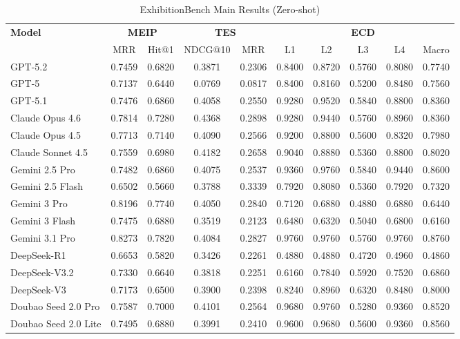\begin{table}[ht]
\centering
\caption{ExhibitionBench Main Results (Zero-shot)}
\label{tab:main-results}
\begin{tabular}{l|cc|cc|ccccc}
\toprule
\textbf{Model} & \multicolumn{2}{c|}{\textbf{MEIP}} & \multicolumn{2}{c|}{\textbf{TES}} & \multicolumn{5}{c}{\textbf{ECD}} \\
 & MRR & Hit@1 & NDCG@10 & MRR & L1 & L2 & L3 & L4 & Macro \\
\midrule
GPT-5.2 & 0.7459 & 0.6820 & 0.3871 & 0.2306 & 0.8400 & 0.8720 & 0.5760 & 0.8080 & 0.7740 \\
GPT-5 & 0.7137 & 0.6440 & 0.0769 & 0.0817 & 0.8400 & 0.8160 & 0.5200 & 0.8480 & 0.7560 \\
GPT-5.1 & 0.7476 & 0.6860 & 0.4058 & 0.2550 & 0.9280 & 0.9520 & 0.5840 & 0.8800 & 0.8360 \\
Claude Opus 4.6 & 0.7814 & 0.7280 & 0.4368 & 0.2898 & 0.9280 & 0.9440 & 0.5760 & 0.8960 & 0.8360 \\
Claude Opus 4.5 & 0.7713 & 0.7140 & 0.4090 & 0.2566 & 0.9200 & 0.8800 & 0.5600 & 0.8320 & 0.7980 \\
Claude Sonnet 4.5 & 0.7559 & 0.6980 & 0.4182 & 0.2658 & 0.9040 & 0.8880 & 0.5360 & 0.8800 & 0.8020 \\
Gemini 2.5 Pro & 0.7482 & 0.6860 & 0.4075 & 0.2537 & 0.9360 & 0.9760 & 0.5840 & 0.9440 & 0.8600 \\
Gemini 2.5 Flash & 0.6502 & 0.5660 & 0.3788 & 0.3339 & 0.7920 & 0.8080 & 0.5360 & 0.7920 & 0.7320 \\
Gemini 3 Pro & 0.8196 & 0.7740 & 0.4050 & 0.2840 & 0.7120 & 0.6880 & 0.4880 & 0.6880 & 0.6440 \\
Gemini 3 Flash & 0.7475 & 0.6880 & 0.3519 & 0.2123 & 0.6480 & 0.6320 & 0.5040 & 0.6800 & 0.6160 \\
Gemini 3.1 Pro & 0.8273 & 0.7820 & 0.4084 & 0.2827 & 0.9760 & 0.9760 & 0.5760 & 0.9760 & 0.8760 \\
DeepSeek-R1 & 0.6653 & 0.5820 & 0.3426 & 0.2261 & 0.4880 & 0.4880 & 0.4720 & 0.4960 & 0.4860 \\
DeepSeek-V3.2 & 0.7330 & 0.6640 & 0.3818 & 0.2251 & 0.6160 & 0.7840 & 0.5920 & 0.7520 & 0.6860 \\
DeepSeek-V3 & 0.7173 & 0.6500 & 0.3900 & 0.2398 & 0.8240 & 0.8960 & 0.6320 & 0.8480 & 0.8000 \\
Doubao Seed 2.0 Pro & 0.7587 & 0.7000 & 0.4101 & 0.2564 & 0.9680 & 0.9760 & 0.5280 & 0.9360 & 0.8520 \\
Doubao Seed 2.0 Lite & 0.7495 & 0.6880 & 0.3991 & 0.2410 & 0.9600 & 0.9680 & 0.5600 & 0.9360 & 0.8560 \\

\end{tabular}
\end{table}
